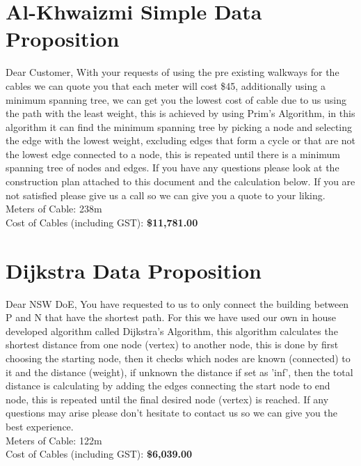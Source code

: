 \documentclass[11pt]{book}
\renewcommand{\=}[1]{\stackrel{#1}{=}} %
\theoremstyle{definition}
\theoremstyle{remark}
\begin{document}
\section{Al-Khwaizmi Simple Data Proposition}
Dear Customer,
With your requests of using the pre existing walkways for the cables we can quote you that each meter will cost \$45, additionally using a minimum spanning tree, we can get you the lowest cost of cable due to us using the path with the least weight, this is achieved by using Prim's Algorithm, in this algorithm it can find the minimum spanning tree by picking a node and selecting
the edge with the lowest weight, excluding edges that form a cycle or that are not the lowest edge connected to a node, this is repeated until there is a minimum spanning tree of nodes and edges.
If you have any questions please look at the construction plan attached to this document and the calculation below. If you are not satisfied please give us a call so we can give you a quote to your liking. \\

Meters of Cable: 238m \\
Cost of Cables (including GST): \textbf{\$11,781.00} \\

\section{Dijkstra Data Proposition}
Dear NSW DoE,
You have requested to us to only connect the building between P and N that have the shortest path. For this we have used our own in house developed algorithm called Dijkstra's Algorithm, this algorithm calculates the shortest distance from one node (vertex) to another node, this is done by first choosing the starting node, then it checks which nodes are known (connected) to it and the distance (weight), if unknown the distance if set as 'inf', then the total distance is calculating by adding the edges connecting the start node to end node, this is repeated until the final desired node (vertex) is reached.
If any questions may arise
please don't hesitate to contact us so we can give you the best experience. \\

Meters of Cable: 122m \\
Cost of Cables (including GST): \textbf{\$6,039.00} \\
\end{document}
